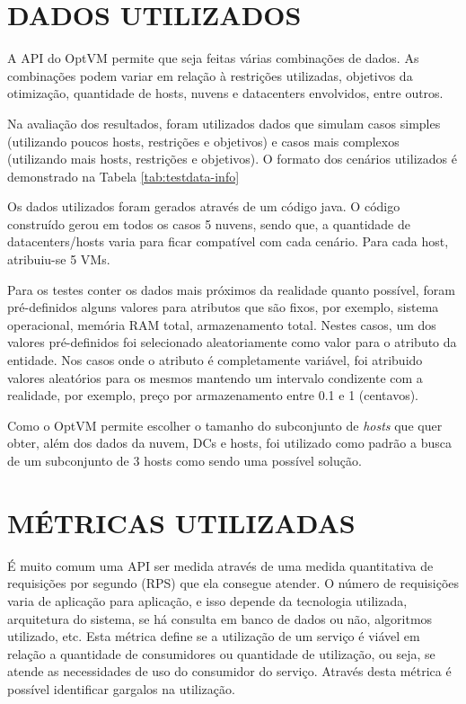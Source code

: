 \section{DADOS UTILIZADOS}
A API do OptVM permite que seja feitas várias combinações de dados. As combinações
podem variar em relação à restrições utilizadas, objetivos da otimização, quantidade
de hosts, nuvens e datacenters envolvidos, entre outros. 

Na avaliação dos resultados, foram utilizados dados que simulam casos simples (utilizando poucos
hosts, restrições e objetivos) e casos mais complexos (utilizando mais hosts, restrições e objetivos). 
O formato dos cenários utilizados é demonstrado na Tabela \ref{tab:testdata-info}



Os dados utilizados foram gerados através de um código java. O código
construído gerou em todos os casos 5 nuvens, sendo que, a quantidade de
datacenters/hosts varia para ficar compatível com cada cenário. Para cada
host, atribuiu-se 5 VMs.

Para os testes conter os dados mais próximos da realidade quanto possível,
foram pré-definidos alguns valores para atributos que são fixos, por exemplo,
sistema operacional, memória RAM total, armazenamento total. Nestes casos, um dos valores
pré-definidos foi selecionado aleatoriamente como valor para o atributo da entidade. 
Nos casos onde o atributo é completamente variável, foi atribuido valores aleatórios para os 
mesmos mantendo um intervalo condizente com a realidade, por exemplo, preço por armazenamento
entre 0.1 e 1 (centavos).

Como o OptVM permite escolher o tamanho do subconjunto de \textit{hosts} que quer obter,
além dos dados da nuvem, DCs e hosts, foi utilizado como padrão a busca de um subconjunto de
3 hosts como sendo uma possível solução. 

\section{MÉTRICAS UTILIZADAS}
É muito comum uma API ser medida através de uma medida quantitativa de requisições 
por segundo (RPS) que ela consegue atender. O número de requisições 
varia de aplicação para aplicação, e isso depende da tecnologia utilizada, 
arquitetura do sistema, se há consulta em banco de dados ou não, algoritmos utilizado, etc.
Esta métrica define se a utilização de um serviço é viável em relação a quantidade de consumidores ou
quantidade de utilização, ou seja, se atende as necessidades de uso do consumidor do serviço. 
Através desta métrica é possível identificar gargalos na utilização.


